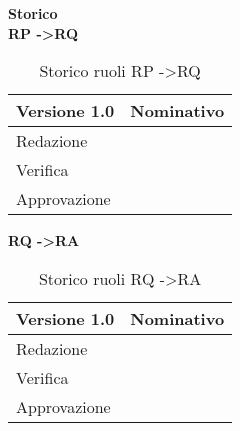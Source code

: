 \newpage

\Large{\textbf{Storico }}\\
\normalsize
\textbf{RP -\textgreater RQ}

\begin{table}[h]
\begin{center}

\begin{tabular}{p{} p{}}
\toprule
\textbf{Versione 1.0}	&	\textbf{Nominativo}\\
\midrule
\midrule
Redazione	&	\VP \\
\midrule
Verifica &	\EZ	\\
\midrule
Approvazione	&	\FZ	\\
\bottomrule
\end{tabular}
\caption{Storico ruoli RP -\textgreater RQ}
\label{tabVers1}
\end{center}
\end{table}

\textbf{RQ -\textgreater RA}

\begin{table}[h]
\begin{center}

\begin{tabular}{p{} p{}}
\toprule
\textbf{Versione 1.0}	&	\textbf{Nominativo}\\
\midrule
\midrule
Redazione	&	\AB \\
\midrule
Verifica &	\MB	\\
\midrule
Approvazione	&	\SL	\\
\bottomrule
\end{tabular}
\caption{Storico ruoli RQ -\textgreater RA}
\label{tabVers2}
\end{center}
\end{table}